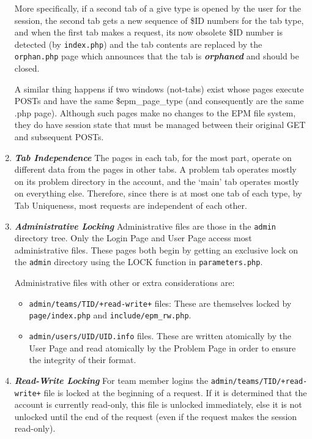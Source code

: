 \documentclass[12pt]{article}
\newcommand{\key}[1]{{\bf \em #1}}
\newcommand{\EOL}{\penalty \exhyphenpenalty}
\begin{document}
\begin{enumerate}
More specifically, if a second tab of a give type is opened by
the user for the session, the second tab gets a new sequence of
\$ID numbers for the tab type, and when the first tab makes a request, its
now obsolete \$ID number is detected (by {\tt index.php}) and
the tab contents are replaced by the {\tt orphan.php} page which
announces that the tab is \key{orphaned} and should be closed.

A similar thing happens if two windows (not-tabs)
exist whose pages execute POSTs and have the same
\$epm\_page\_type (and consequently are the same .php page).
Although such pages make no changes to
the EPM file system, they do have session state that must be
managed between their original GET and subsequent POSTs.

\item \key{Tab Independence}
The pages in each
tab, for the most part, operate on different data from the pages
in other tabs.  A problem tab operates mostly on its problem
directory in the account, and the `main' tab operates mostly on
everything else.  Therefore, since there is at most one tab of
each type, by Tab Uniqueness, most requests are independent
of each other.

\item \key{Administrative Locking}
Administrative files are those in the {\tt admin} directory tree.
Only the Login Page and User Page access most administrative files.
These pages both begin by getting an exclusive lock on the
{\tt admin} directory using the LOCK function in {\tt parameters.php}.

Administrative files with other or extra considerations are:
\begin{itemize}
\item {\tt admin/teams/TID/+read-write+} files: These are themselves
locked by {\tt page/\EOL index.php} and {\tt include/\EOL epm\_rw.php}.
\item {\tt admin/users/UID/UID.info} files.  These are written
atomically by the User Page and read atomically by the Problem Page
in order to ensure the integrity of their format.
\end{itemize}

\item \key{Read-Write Locking}
For team member logins the {\tt admin/teams/TID/+read-write+}
file is locked at the beginning of a request.  If it is
determined that the account is currently read-only, this file
is unlocked immediately, else it is not unlocked until the end of the
request (even if the request makes the session read-only).


\end{enumerate}
\end{document}
